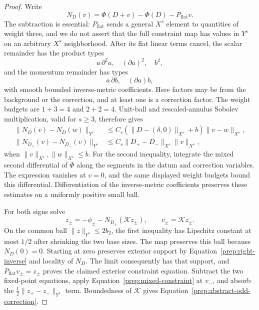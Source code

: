 \begin{proof}
Write
\[
 N_D(v)=\Phi(D+v)-\Phi(D)-P_{\mathrm{flat}}v.
\]
The subtraction is essential: $P_{\mathrm{flat}}$ sends a general
$X^s$ element to quantities of weight three, and we do not assert
that the full constraint map has values in $Y^s$ on an arbitrary
$X^s$ neighborhood.  After its flat linear terms cancel, the scalar
remainder has the product types
\[
 a\,\partial^2a,\quad (\partial a)^2,\quad b^2,
\]
and the momentum remainder has types
\[
 a\,\partial b,\quad (\partial a)b,
\]
with smooth bounded inverse-metric coefficients.  Here factors may
be from the background or the correction, and at least one is a
correction factor.  The weight budgets are $1+3=4$ and $2+2=4$.
Unit-ball and rescaled-annulus Sobolev multiplication, valid for
$s\ge3$, therefore gives
\begin{align}
 \|N_D(v)-N_D(w)\|_{Y^s}
   &\le C_s(\|D-(\delta,0)\|_{X^s}+b)
                   \|v-w\|_{X^s},\label{prep:contraction-estimate}\\
 \|N_{D_+}(v)-N_{D_-}(v)\|_{Y^s}
   &\le C_s\|D_+-D_-\|_{X^s}\|v\|_{X^s},
                    \label{prep:mixed-constraint}
\end{align}
when $\|v\|_{X^s},\|w\|_{X^s}\le b$.  For the second inequality,
integrate the mixed second differential of $\Phi$ along the segments
in the datum and correction variables.  The expression vanishes at
$v=0$, and the same displayed weight budgets bound this differential.
Differentiation of the inverse-metric coefficients preserves these
estimates on a uniformly positive small ball.

For both signs solve
\begin{equation}\label{prep:shared-fixed-point}
 z_\pm=-\phi_\pm-N_{D_\pm}(\mathcal Kz_\pm),\qquad
 v_\pm=\mathcal Kz_\pm.
\end{equation}
On the common ball $\|z\|_{Y^s}\le2b_2$, the first inequality has
Lipschitz constant at most $1/2$ after shrinking the two base sizes.
The map preserves this ball because $N_D(0)=0$.  Starting at zero
preserves exterior support by Equation~\eqref{prep:right-inverse}
and locality of $N_D$.  The limit consequently has that support,
and $P_{\mathrm{flat}}v_\pm=z_\pm$ proves the claimed exterior
constraint equation.  Subtract the two fixed-point equations, apply
Equation~\eqref{prep:mixed-constraint} at $v_-$, and absorb the
$\frac12\|z_+-z_-\|_{Y^s}$ term.  Boundedness of $\mathcal K$
gives Equation~\eqref{prep:abstract-odd-correction}.


\end{proof}
